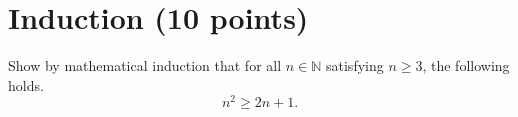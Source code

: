 \documentclass[11pt]{article}
\newcounter{pgpts}
\newcounter{cumpts}
\newcommand{\cnewpage}{\addtocounter{cumpts}{\value{pgpts}}\newpage\setcounter{pgpts}{0}}
\begin{document}








\cnewpage

\section{Induction (10 points)}\addtocounter{pgpts}{10}
Show by mathematical induction that for all $n\in \mathbb{N}$ satisfying $n\geq 3$, the following holds.
\[
n^2 \geq 2n+1.
\]

\cnewpage
\end{document}
